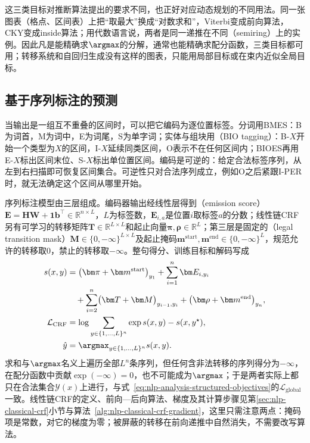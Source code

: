 这三类目标对推断算法提出的要求不同，也正好对应动态规划的不同用法。同一张图表（格点、区间表）上把“取最大”换成“对数求和”，Viterbi变成前向算法，CKY变成inside算法；用代数语言说，两者是同一递推在不同（semiring）上的实例。因此凡是能精确求$\argmax$的分解，通常也能精确求配分函数，三类目标都可用；转移系统和自回归生成没有这样的图表，只能用局部目标或在束内近似全局目标。

\subsection{基于序列标注的预测}
\label{sec:nlp-analysis-paradigm-tagging}

当输出是一组互不重叠的区间时，可以把它编码为逐位置标签。分词用BMES：B为词首，M为词中，E为词尾，S为单字词；实体与组块用（BIO tagging）：B-$X$开始一个类型为$X$的区间，I-$X$延续同类区间，O表示不在任何区间内；BIOES再用E-$X$标出区间末位、S-$X$标出单位置区间。编码是可逆的：给定合法标签序列，从左到右扫描即可恢复区间集合。可逆性只对合法序列成立，例如O之后紧跟I-PER时，就无法确定这个区间从哪里开始。

序列标注模型由三层组成。编码器输出经线性层得到（emission score）$\bm E=\bm H\bm W+\bm 1\bm b^\top\in\mathbb R^{n\times L}$，$L$为标签数，$\bm E_{i,a}$是位置$i$取标签$a$的分数；线性链CRF另有可学习的转移矩阵$\bm T\in\mathbb R^{L\times L}$和起止向量$\bm\pi,\bm\rho\in\mathbb R^{L}$；第三层是固定的（legal transition mask）$\bm M\in\{0,-\infty\}^{L\times L}$及起止掩码$\bm m^{\mathrm{start}},\bm m^{\mathrm{end}}\in\{0,-\infty\}^{L}$，规范允许的转移取0，禁止的转移取$-\infty$。整句得分、训练目标和解码写成
\begin{equation}
  \begin{aligned}
    s(x,y)&=\bigl(\bm\pi+\bm m^{\mathrm{start}}\bigr)_{y_1}
      +\sum_{i=1}^{n}\bm E_{i,y_i}\\
      &\quad+\sum_{i=2}^{n}\bigl(\bm T+\bm M\bigr)_{y_{i-1},y_i}
      +\bigl(\bm\rho+\bm m^{\mathrm{end}}\bigr)_{y_n},\\
    \mathcal L_{\mathrm{CRF}}&=\log\sum_{y\in\{1,\ldots,L\}^n}\exp s(x,y)-s(x,y^\star),\\
    \hat y&=\argmax_{y\in\{1,\ldots,L\}^n}s(x,y).
  \end{aligned}
  \label{eq:nlp-analysis-legal-mask}
\end{equation}
求和与$\argmax$名义上遍历全部$L^n$条序列，但任何含非法转移的序列得分为$-\infty$，在配分函数中贡献$\exp(-\infty)=0$，也不可能成为$\argmax$；于是两者实际上都只在合法集合$\mathcal Y(x)$上进行，与式~\eqref{eq:nlp-analysis-structured-objectives}的$\mathcal L_{\mathrm{global}}$一致。线性链CRF的定义、前向—后向算法、梯度及其计算步骤见第\ref{sec:nlp-classical-crf}小节与算法~\ref{alg:nlp-classical-crf-gradient}，这里只需注意两点：掩码项是常数，对它的梯度为零；被屏蔽的转移在前向递推中自然消失，不需要改写算法。


